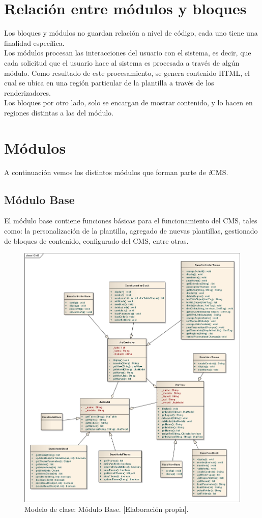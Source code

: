 \section{Relaci\'on entre m\'odulos y bloques}
Los bloques y m\'odulos no guardan relaci\'on a nivel de c\'odigo, cada uno tiene una finalidad espec\'ifica.\\
Los m\'odulos procesan las interacciones del usuario con el sistema, es decir, que cada solicitud que el usuario hace al sistema es procesada a trav\'es de alg\'un m\'odulo. Como resultado de este procesamiento, se genera contenido HTML, el cual se ubica en una regi\'on particular de la plantilla a trav\'es de los renderizadores.\\
Los bloques por otro lado, solo se encargan de mostrar contenido, y lo hacen en regiones distintas a las del m\'odulo.

\section{M\'odulos}
A continuaci\'on vemos los distintos m\'odulos que forman parte de \textit{i}CMS.

\subsection{M\'odulo Base}
El m\'odulo base contiene funciones b\'asicas para el funcionamiento del CMS, tales como: la personalizaci\'on de la plantilla, agregado de nuevas plantillas, gestionado de bloques de contenido, configurado del CMS, entre otras.

\begin{figure}[h]
\centering
\includegraphics[scale=.35, keepaspectratio=true]{imagenes/13_imagen.png}
\caption{Modelo de clase: M\'odulo Base. [Elaboraci\'on propia].}
\end{figure}

